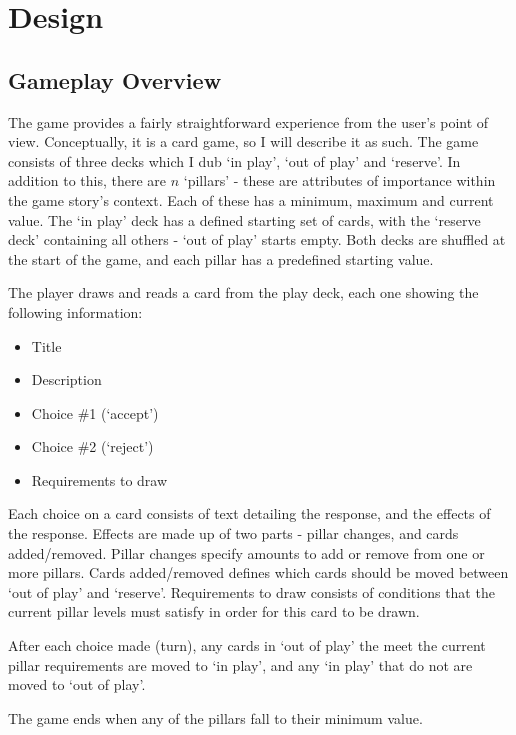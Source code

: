 \chapter{Design}


\section{Gameplay Overview}
The game provides a fairly straightforward experience from the user's point of view.
Conceptually, it is a card game, so I will describe it as such.
The game consists of three decks which I dub `in play', `out of play' and `reserve'. In addition to this, there are $n$ `pillars' - these are attributes of importance within the game story's context. Each of these has a minimum, maximum and current value.
The `in play' deck has a defined starting set of cards, with the `reserve deck' containing all others - `out of play' starts empty.
Both decks are shuffled at the start of the game, and each pillar has a predefined starting value.

The player draws and reads a card from the play deck, each one showing the following information:

\begin{itemize}
	\item Title
	\item Description
	\item Choice \#1 (`accept')
	\item Choice \#2 (`reject')
	\item Requirements to draw
\end{itemize}
Each choice on a card consists of text detailing the response, and the effects of the response. Effects are made up of two parts - pillar changes, and cards added/removed. Pillar changes specify amounts to add or remove from one or more pillars. Cards added/removed defines which cards should be moved between `out of play' and `reserve'.
Requirements to draw consists of conditions that the current pillar levels must satisfy in order for this card to be drawn.

After each choice made (turn), any cards in `out of play' the meet the current pillar requirements are moved to `in play', and any `in play' that do not are moved to `out of play'.

The game ends when any of the pillars fall to their minimum value.

